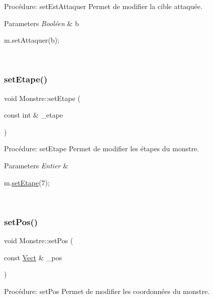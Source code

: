 Procédure\+: set\+Est\+Attaquer Permet de modifier la cible attaquée. 


\begin{DoxyParams}{Parameters}
{\em Booléen} & b 
\begin{DoxyCode}
m.setAttaquer(b);
\end{DoxyCode}
 \\
\hline
\end{DoxyParams}
\mbox{\label{classMonstre_a51895539b2db4bd6e267e0ac5a1729ce}} 
\subsubsection{\texorpdfstring{set\+Etape()}{setEtape()}}
{\footnotesize\ttfamily void Monstre\+::set\+Etape (\begin{DoxyParamCaption}\item[{const int \&}]{\+\_\+etape }\end{DoxyParamCaption})}



Procédure\+: set\+Etape Permet de modifier les étapes du monstre. 


\begin{DoxyParams}{Parameters}
{\em Entier} & 
\begin{DoxyCode}
m.\hyperlink{classMonstre_a51895539b2db4bd6e267e0ac5a1729ce}{setEtape}(7);
\end{DoxyCode}
 \\
\hline
\end{DoxyParams}
\mbox{\label{classMonstre_ac1ba6618f2a485ea20a448dbbddbf368}} 
\subsubsection{\texorpdfstring{set\+Pos()}{setPos()}}
{\footnotesize\ttfamily void Monstre\+::set\+Pos (\begin{DoxyParamCaption}\item[{const \hyperlink{classVect}{Vect} \&}]{\+\_\+pos }\end{DoxyParamCaption})}



Procédure\+: set\+Pos Permet de modifier les coordonnées du monstre. 


